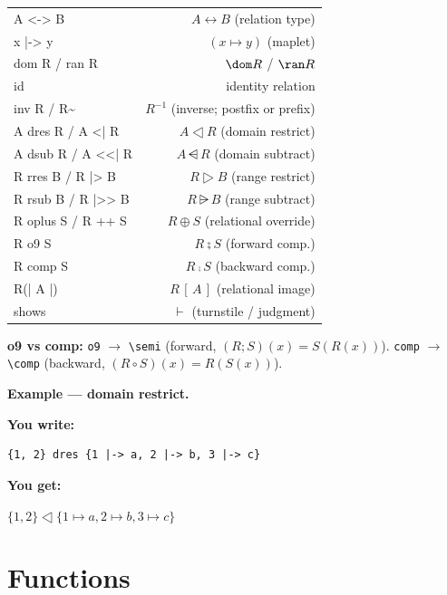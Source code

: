 \documentclass[10pt,landscape,a4paper]{article}
\newenvironment{exwrite}%
  {\par\nobreak\noindent\scriptsize\textbf{You write:}\par\nobreak\vspace{0pt}\scriptsize}%
  {\vspace{1pt}\nobreak}
\newenvironment{exget}%
  {\par\nobreak\noindent\scriptsize\textbf{You get:}\par\nobreak\vspace{0pt}\small}%
  {\par\vspace{3pt}}
\begin{document}
\begin{multicols}{2}
\begin{tabularx}{\columnwidth}{LR}
A <-> B              & $A \rel B$ (relation type) \\
x |-> y              & $(x \mapsto y)$ (maplet) \\
dom R / ran R        & $\dom R$ / $\ran R$ \\
id                   & identity relation \\
inv R / R\textasciitilde & $R^{-1}$ (inverse; postfix or prefix) \\
A dres R / A <| R    & $A \dres R$ (domain restrict) \\
A dsub R / A <<| R   & $A \ndres R$ (domain subtract) \\
R rres B / R |> B    & $R \rres B$ (range restrict) \\
R rsub B / R |>> B   & $R \nrres B$ (range subtract) \\
R oplus S / R ++ S   & $R \oplus S$ (relational override) \\
R o9 S               & $R \semi S$ (forward comp.) \\
R comp S             & $R \comp S$ (backward comp.) \\
R(| A |)             & $R\,[\,A\,]$ (relational image) \\
shows                & $\vdash$ (turnstile / judgment) \\
\end{tabularx}

{\footnotesize\textbf{o9 vs comp:} \texttt{o9} $\to$ \texttt{\textbackslash semi} (forward, $(R;S)(x)=S(R(x))$). \texttt{comp} $\to$ \texttt{\textbackslash comp} (backward, $(R\circ S)(x)=R(S(x))$).}

\smallskip
{}
\textbf{Example — domain restrict.}

\begin{exwrite}%
\begin{verbatim}
{1, 2} dres {1 |-> a, 2 |-> b, 3 |-> c}
\end{verbatim}
\end{exwrite}
\begin{exget}%
\begin{center}
$\{1,2\} \dres \{1 \mapsto a, 2 \mapsto b, 3 \mapsto c\}$
\end{center}
\end{exget}

\section{Functions}


\end{multicols}
\end{document}
